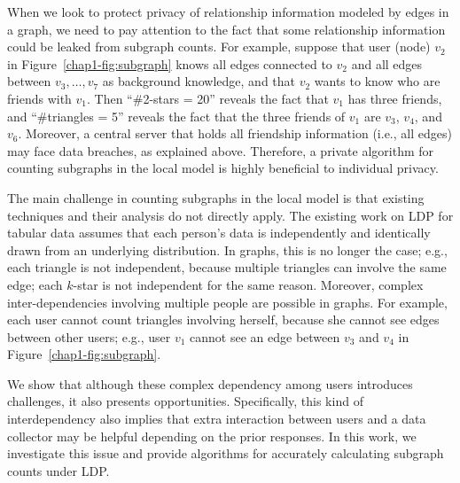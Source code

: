 When we look to protect privacy of relationship information modeled by edges in a graph, 
we need to pay attention to the fact 
that some relationship information 
could be leaked from subgraph counts. 
For example, 
suppose that user (node) $v_2$ in Figure~\ref{chap1-fig:subgraph} knows 
all edges connected to $v_2$ and 
all edges between $v_3, \ldots, v_7$ 
as background knowledge, and that $v_2$ wants to know who are friends with $v_1$. 
Then ``\#2-stars = 20'' reveals 
the fact that $v_1$ has three friends, and ``\#triangles = 5'' reveals 
the fact that the three friends of $v_1$ are $v_3$, $v_4$, and $v_6$. 
Moreover, a central server that holds all friendship information (i.e., all edges) may face data breaches, as explained above. 
Therefore, a private algorithm for counting subgraphs in the local model is highly beneficial to individual privacy.

The main challenge in counting subgraphs in the local model is that existing techniques and their analysis do not directly apply. 
The existing work on LDP for tabular data assumes that 
each person's data 
is independently and identically drawn from an underlying distribution. 
In graphs, this is no longer the case; e.g., 
each triangle is not independent, 
because multiple triangles can involve the same edge; 
each $k$-star is not independent for the same reason. 
Moreover, complex inter-dependencies involving multiple people 
are 
possible in graphs. 
For example, each user cannot count triangles involving herself, because she cannot see edges between other users; 
e.g., 
user 
$v_1$ cannot see an edge between $v_3$ and $v_4$ in Figure~\ref{chap1-fig:subgraph}. 

We show that although these complex dependency among users introduces challenges, it also presents opportunities. Specifically, this kind of interdependency also implies that extra interaction between users and a data collector may be helpful depending on the prior responses. 
In this work, we investigate this issue and provide algorithms for accurately calculating subgraph counts under LDP. 

